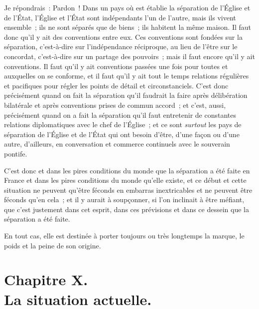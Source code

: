 \documentclass[french,twoside]{book} %
\begin{document}
Je répondrais : Pardon ! Dans un pays où est établie la séparation de l’Église et de l’État, l’Église et l’État sont indépendants l’un de l’autre, mais ils vivent ensemble ; ils ne sont séparés que de biens ; ils habitent la même maison. Il faut donc qu’il y ait des conventions entre eux. Ces conventions sont fondées sur la séparation, c’est-à-dire sur l’indépendance réciproque, au lieu de l’être sur le concordat, c’est-à-dire sur un partage des pouvoirs ; mais il faut encore qu’il y ait conventions. Il faut qu’il y ait conventions passées une fois pour toutes et auxquelles on se conforme, et il faut qu’il y ait tout le temps relations régulières et pacifiques  pour régler les points de détail et circonstanciels. C’est donc précisément quand on fait la séparation qu’il faudrait la faire après délibération bilatérale et après conventions prises de commun accord ; et c’est, aussi, précisément quand on a fait la séparation qu’il faut entretenir de constantes relations diplomatiques avec le chef de l’Église ; et ce sont {\itshape surtout} les pays de séparation de l’Église et de l’État qui ont besoin d’être, d’une façon ou d’une autre, d’ailleurs, en conversation et commerce continuels avec le souverain pontife.\par
C’est donc et dans les pires conditions du monde que la séparation a été faite en France et dans les pires conditions du monde qu’elle existe, et ce début et cette situation ne peuvent qu’être féconds en embarras inextricables et ne peuvent être féconds qu’en cela ; et il y aurait à soupçonner, si l’on inclinait à être méfiant, que c’est justement dans cet esprit, dans ces prévisions et dans ce dessein que la séparation a été faite.\par
En tout cas, elle est destinée à porter toujours ou très longtemps la marque, le poids et la peine de son origine.
 \section[{Chapitre X. La situation actuelle.}]{Chapitre X.\\
La situation actuelle.}\renewcommand{\leftmark}{Chapitre X.\\
La situation actuelle.}
\end{document}
